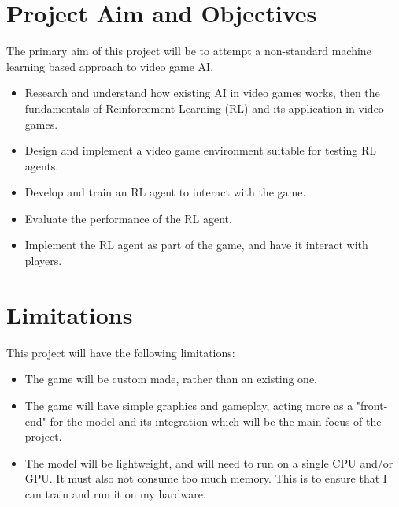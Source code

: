 \section{Project Aim and Objectives}
The primary aim of this project will be to attempt a non-standard machine learning based approach to video game AI.
\begin{itemize} 
    \item Research and understand how existing AI in video games works, then the fundamentals of Reinforcement Learning (RL) and its application in video games.
    \item Design and implement a video game environment suitable for testing RL agents.
    \item Develop and train an RL agent to interact with the game.
    \item Evaluate the performance of the RL agent.
    \item Implement the RL agent as part of the game, and have it interact with players.
\end{itemize}

\section{Limitations}
This project will have the following limitations:
\begin{itemize} 
    \item The game will be custom made, rather than an existing one.
    \item The game will have simple graphics and gameplay, acting more as a "front-end" for the model and its integration which will be the main focus of the project.
    \item The model will be lightweight, and will need to run on a single CPU and/or GPU. It must also not consume too much memory. This is to ensure that I can train and run it on my hardware.
\end{itemize}
